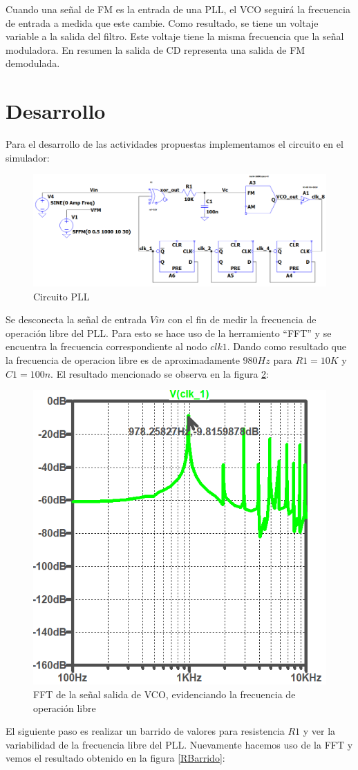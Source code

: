\documentclass[10pt,a4paper]{IEEEtran}
\begin{document}
    Cuando una señal de FM es la entrada de una PLL, el VCO seguirá la frecuencia de entrada a medida que este cambie. Como resultado, se tiene un voltaje variable a la salida del filtro. Este voltaje tiene la misma frecuencia que la señal 
    moduladora. 
    En resumen la salida de CD representa una salida de FM demodulada.
\section{Desarrollo}
    Para el desarrollo de las actividades propuestas implementamos el circuito en el simulador:
    \begin{figure}[H]
        \centering
        \includegraphics[width=.45\textwidth]{Fig/CircuitoBase}
        \caption{Circuito PLL}
        \label{circuito}
    \end{figure}
Se desconecta la señal de entrada $Vin$ con el fin de medir la frecuencia de operación libre
del PLL. Para esto se hace uso de la herramiento ``FFT'' y se encuentra la frecuencia correspondiente al nodo $clk1$. Dando como resultado que la 
frecuencia de operacion libre es de aproximadamente $980Hz$ para $R1=10K$ y $C1=100n$. El resultado mencionado se observa 
en la figura \ref{Flibre}:
\begin{figure}[H]
    \centering
    \includegraphics[width=.45\textwidth]{Fig/FrecuenciaLibre_VCO16K_R10K_C100n}
    \caption{FFT de la señal salida de VCO, evidenciando la frecuencia de operación libre}
    \label{Flibre}
\end{figure}
El siguiente paso es realizar un barrido de valores para resistencia $R1$ y ver la variabilidad de la frecuencia libre del PLL. Nuevamente 
hacemos uso de la FFT y vemos el resultado obtenido en la figura \ref{RBarrido}:
\end{document}
